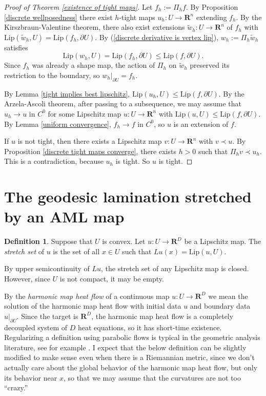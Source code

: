\documentclass[reqno,11pt]{amsart}
\newcommand{\RR}{\mathbf{R}}
\newcommand{\Lip}{\mathrm{Lip}}
\newcommand{\dfn}[1]{\emph{#1}\index{#1}}
\theoremstyle{definition}
\newtheorem{definition}[theorem]{Definition}
\numberwithin{equation}{section}
\begin{document}
\begin{proof}[Proof of Theorem \ref{existence of tight maps}]
Let $f_h := \Pi_h f$.
By Proposition \ref{discrete wellposedness} there exist $h$-tight maps $u_h: U \to \RR^n$ extending $f_h$.
By the Kirszbraun-Valentine theorem, there also exist extensions $\tilde w_h: U \to \RR^n$ of $f_h$ with $\Lip(\tilde w_h, U) = \Lip(f_h, \partial U)$.
By (\ref{discrete derivative is vertex lip}), $w_h := \Pi_h \tilde w_h$ satisfies
$$\Lip(w_h, U) = \Lip(f_h, \partial U) \leq \Lip(f, \partial U).$$
Since $f_h$ was already a shape map, the action of $\Pi_h$ on $\tilde w_h$ preserved its restriction to the boundary, so $w_h|_{\partial U} = f_h$.

By Lemma \ref{tight implies best lipschitz}, $\Lip(u_h, U) \leq \Lip(f, \partial U)$.
By the Arzela-Ascoli theorem, after passing to a subsequence, we may assume that $u_h \to u$ in $C^0$ for some Lipschitz map $u: U \to \RR^n$ with $\Lip(u, U) \leq \Lip(f, \partial U)$.
By Lemma \ref{uniform convergence}, $f_h \to f$ in $C^0$, so $u$ is an extension of $f$.

If $u$ is not tight, then there exists a Lipschitz map $v: U \to \RR^n$ with $v \prec u$.
By Proposition \ref{discrete tight maps converge}, there exists $h > 0$ such that $\Pi_h v \prec u_h$.
This is a contradiction, because $u_h$ is tight.
So $u$ is tight.
\end{proof}

\section{The geodesic lamination stretched by an AML map}
\begin{definition}
Suppose that $U$ is convex.
Let $u: U \to \RR^D$ be a Lipschitz map.
The \dfn{stretch set} of $u$ is the set of all $x \in U$ such that $Lu(x) = \Lip(u, U)$.
\end{definition}

By upper semicontinuity of $Lu$, the stretch set of any Lipschitz map is closed.
However, since $U$ is not compact, it may be empty.

By the \dfn{harmonic map heat flow} of a continuous map $u: U \to \RR^D$ we mean the solution of the harmonic map heat flow with initial data $u$ and boundary data $u|_{\partial U}$.
Since the target is $\RR^D$, the harmonic map heat flow is a completely decoupled system of $D$ heat equations, so it has short-time existence.
Regularizing a definition using parabolic flows is typical in the geometric analysis literature, see for example \cite{Burkhardt-Guim2019}.
I expect that the below definition can be slightly modified to make sense even when there is a Riemannian metric, since we don't actually care about the global behavior of the harmonic map heat flow, but only its behavior near $x$, so that we may assume that the curvatures are not too ``crazy.''
\end{document}
